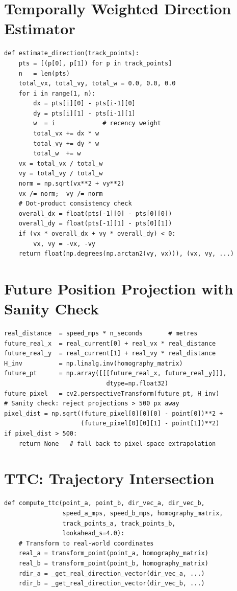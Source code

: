 \documentclass[12pt]{report}
\begin{document}
\begin{appendices}
\section{Temporally Weighted Direction Estimator}
\begin{lstlisting}[caption={Weighted direction vector with dot-product check},label={lst:direction}]
def estimate_direction(track_points):
    pts = [(p[0], p[1]) for p in track_points]
    n   = len(pts)
    total_vx, total_vy, total_w = 0.0, 0.0, 0.0
    for i in range(1, n):
        dx = pts[i][0] - pts[i-1][0]
        dy = pts[i][1] - pts[i-1][1]
        w  = i             # recency weight
        total_vx += dx * w
        total_vy += dy * w
        total_w  += w
    vx = total_vx / total_w
    vy = total_vy / total_w
    norm = np.sqrt(vx**2 + vy**2)
    vx /= norm;  vy /= norm
    # Dot-product consistency check
    overall_dx = float(pts[-1][0] - pts[0][0])
    overall_dy = float(pts[-1][1] - pts[0][1])
    if (vx * overall_dx + vy * overall_dy) < 0:
        vx, vy = -vx, -vy
    return float(np.degrees(np.arctan2(vy, vx))), (vx, vy, ...)
\end{lstlisting}

\section{Future Position Projection with Sanity Check}
\begin{lstlisting}[caption={1-second ahead projection in world space with fallback},label={lst:projection}]
real_distance  = speed_mps * n_seconds       # metres
future_real_x  = real_current[0] + real_vx * real_distance
future_real_y  = real_current[1] + real_vy * real_distance
H_inv          = np.linalg.inv(homography_matrix)
future_pt      = np.array([[[future_real_x, future_real_y]]],
                            dtype=np.float32)
future_pixel   = cv2.perspectiveTransform(future_pt, H_inv)
# Sanity check: reject projections > 500 px away
pixel_dist = np.sqrt((future_pixel[0][0][0] - point[0])**2 +
                     (future_pixel[0][0][1] - point[1])**2)
if pixel_dist > 500:
    return None   # fall back to pixel-space extrapolation
\end{lstlisting}

\section{TTC: Trajectory Intersection}
\begin{lstlisting}[caption={TTC via ray--segment intersection in world space},label={lst:ttc_intersection}]
def compute_ttc(point_a, point_b, dir_vec_a, dir_vec_b,
                speed_a_mps, speed_b_mps, homography_matrix,
                track_points_a, track_points_b,
                lookahead_s=4.0):
    # Transform to real-world coordinates
    real_a = transform_point(point_a, homography_matrix)
    real_b = transform_point(point_b, homography_matrix)
    rdir_a = _get_real_direction_vector(dir_vec_a, ...)
    rdir_b = _get_real_direction_vector(dir_vec_b, ...)


\end{lstlisting}
\end{appendices}
\end{document}
